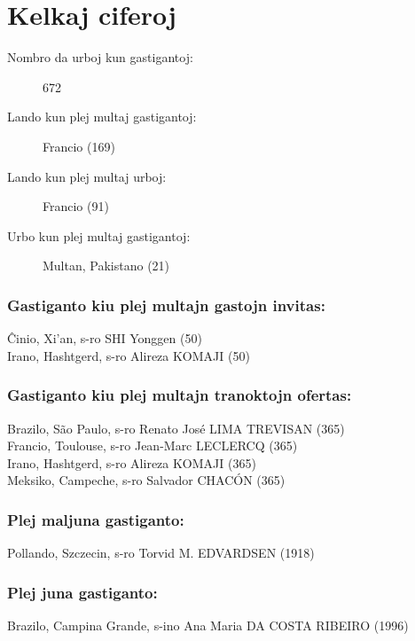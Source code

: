 \section{Kelkaj ciferoj}

\begin{description}
    \item[Nombro da urboj kun gastigantoj:] 672 
    \item[Lando kun plej multaj gastigantoj:] Francio (169) 
    \item[Lando kun plej multaj urboj:] Francio (91) 
    \item[Urbo kun plej multaj gastigantoj:] Multan, Pakistano (21) 
\end{description}



\subsubsection{Gastiganto kiu plej multajn gastojn invitas:}
Ĉinio, Xi’an, s-ro SHI Yonggen (50)\\
Irano, Hashtgerd, s-ro Alireza KOMAJI (50)\\

\subsubsection{Gastiganto kiu plej multajn tranoktojn ofertas:}
Brazilo, São Paulo, s-ro Renato José LIMA TREVISAN (365)\\
Francio, Toulouse, s-ro Jean-Marc LECLERCQ (365)\\
Irano, Hashtgerd, s-ro Alireza KOMAJI (365)\\
Meksiko, Campeche, s-ro Salvador CHACÓN (365)\\

\subsubsection{Plej maljuna gastiganto:}
Pollando, Szczecin, s-ro Torvid M. EDVARDSEN (1918)\\

\subsubsection{Plej juna gastiganto:}
Brazilo, Campina Grande, s-ino Ana Maria DA COSTA RIBEIRO (1996)\\